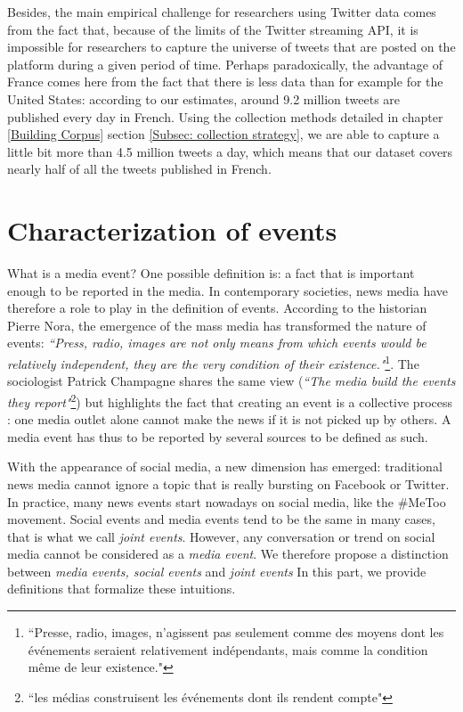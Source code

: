 Besides, the main empirical challenge for researchers
using Twitter data comes from the fact that, because of the limits of the Twitter streaming
API, it is impossible for researchers to capture the universe of tweets that are posted on the
platform during a given period of time. Perhaps paradoxically, the advantage of France comes
here from the fact that there is less data than for example for the United States: according to our estimates, around 9.2 million tweets are published every day in French. Using the collection methods detailed in chapter \ref{Building Corpus} section \ref{Subsec: collection strategy}, we are able to capture a little bit more than 4.5 million tweets a day, which means that our dataset covers nearly half of all the tweets published in French.

\section{Characterization of events}

What is a media event? One possible definition is: a fact that is important enough to be reported in the media. In contemporary societies, news media have therefore a role to play in the definition of events.  According to the historian Pierre Nora, the emergence of the mass media has transformed the nature of events: \textit{``Press, radio, images are not only means from which events would be relatively independent, they are the very condition of their existence."}\footnote{``Presse, radio, images, n'agissent pas seulement comme des moyens dont les événements seraient relativement indépendants, mais comme la condition même de leur existence."}\citep{nora_evenement_1972}. The sociologist Patrick Champagne \citep{champagne_evenement_2000} shares the same view (\textit{``The media build the events they report"}\footnote{``les médias construisent les événements dont ils rendent compte"}) but highlights the fact that creating an event is a collective process : one media outlet alone cannot make the news if it is not picked up by others. A media event has thus to be reported by several sources to be defined as such.


With the appearance of social media, a new dimension has emerged: traditional news media cannot ignore a topic that is really bursting on Facebook or Twitter. In practice, many news events start nowadays on social media, like the \#MeToo movement.  Social events and media events tend to be the same in many cases, that is what we call \textit{joint events}. However, any conversation or trend on social media cannot be considered as a \textit{media event}. We therefore propose a distinction between \textit{media events, social events} and \textit{joint events} In this part, we  provide definitions that formalize these intuitions.

